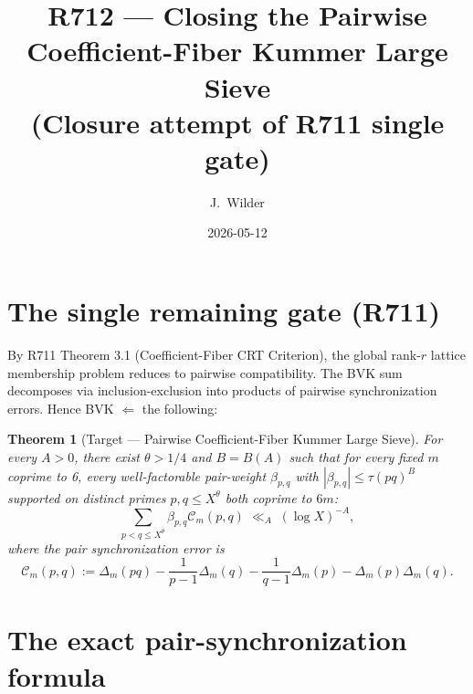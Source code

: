 \documentclass[11pt]{article}
\title{R712 --- Closing the Pairwise Coefficient-Fiber Kummer Large Sieve\\
(Closure attempt of R711 single gate)}
\author{J.\ Wilder}
\date{2026-05-12}
\newtheorem{theorem}{Theorem}[section]
\begin{document}
\maketitle

\begin{center}
\end{center}

\section{The single remaining gate (R711)}

By R711 Theorem 3.1 (Coefficient-Fiber CRT Criterion), the global rank-$r$ lattice membership problem reduces to pairwise compatibility. The BVK sum decomposes via inclusion-exclusion into products of pairwise synchronization errors. Hence BVK $\Longleftarrow$ the following:

\begin{theorem}[Target --- Pairwise Coefficient-Fiber Kummer Large Sieve]\label{thm:pairwise-target}
For every $A > 0$, there exist $\theta > 1/4$ and $B = B(A)$ such that for every fixed $m$ coprime to 6, every well-factorable pair-weight $\beta_{p,q}$ with $|\beta_{p,q}| \leq \tau(pq)^B$ supported on distinct primes $p, q \leq X^\theta$ both coprime to $6m$:
\begin{equation}\label{eq:pair-target}
\sum_{p < q \leq X^\theta} \beta_{p,q} \mathcal{C}_m(p, q) \;\ll_A\; (\log X)^{-A},
\end{equation}
where the pair synchronization error is
\[
\mathcal{C}_m(p, q) := \Delta_m(pq) - \frac{1}{p-1}\Delta_m(q) - \frac{1}{q-1}\Delta_m(p) - \Delta_m(p)\Delta_m(q).
\]
\end{theorem}

\section{The exact pair-synchronization formula}
\end{document}
